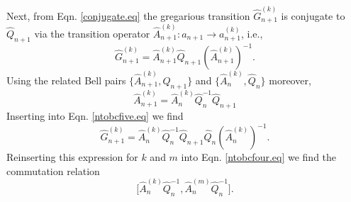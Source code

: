 \documentclass[11pt]{article}
\newcommand{\hA}{\hat { A}}
\newcommand{\hG}{\hat G}
\newcommand{\hQ}{\hat Q}
\newcommand{\achain}{a}
\begin{document}
Next, from Eqn. \eqref{conjugate.eq} the gregarious transition
$\hG_{n+1}^{(k)}$ is conjugate to $\hQ_{n+1}$ via
the transition operator $\hA_{n+1}^{(k)}: \achain_{n+1} \rightarrow \achain_{n+1}^{(k)}$, i.e., 
\begin{equation}
\hG_{n+1}^{(k)}=\hA_{n+1}^{(k)}\hQ_{n+1}(\hA_{n+1}^{(k)})^{-1}.  \label{ntobcfive.eq} 
  \end{equation} 
Using the related Bell pairs $\{\hA_{n+1}^{(k)},\hQ_{n+1}\}$ and
$\{\hA_n^{(k)},\hQ_{n}\}$ moreover,
\begin{equation}
  \hA_{n+1}^{(k)} = \hA_n^{(k)}\hQ_{n}^{-1} \hQ_{n+1}
\end{equation}
Inserting into Eqn. \eqref{ntobcfive.eq} we find   
\begin{equation} 
  \hG_{n+1}^{(k)}= \hA_n^{(k)}\hQ_{n}^{-1} \hQ_{n+1} \hQ_{n}
  (\hA_n^{(k)})^{-1}. 
\end{equation}
Reinserting this expression for $k$ and $m$ into
Eqn. \eqref{ntobcfour.eq} we find the commutation relation 
\begin{equation}
\bigl[ \hA_n^{(k)} \hQ_n^{-1}, \hA_n^{(m)}
\hQ_n^{-1}\bigr]. \label{ntobccommrel.eq} 
\end{equation} 
\end{document}

